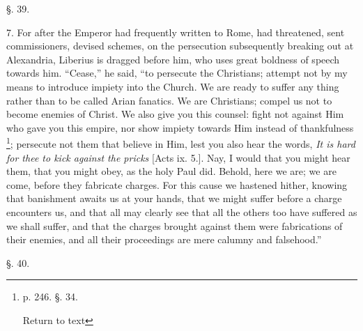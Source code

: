§. 39.

7. For after the Emperor had frequently written
to Rome, had threatened, sent commissioners, devised schemes, on the
persecution subsequently breaking out at Alexandria, Liberius is
dragged before him, who uses great boldness of speech towards him. ``Cease,''
he said, ``to persecute the Christians; attempt not by my means to
introduce impiety into the Church. We are ready to suffer any thing
rather than to be called Arian fanatics. We are Christians; compel us
not to become enemies of Christ. We also give you this counsel: fight
not against Him who gave you this empire, nor show impiety towards Him
instead of thankfulness \footnote{p. 246. §. 34.

Return to text}; persecute
not them that believe in Him, lest you also hear the words, \emph{It is
hard for thee to kick against the pricks} [Acts ix. 5.]. Nay, I
would that you might hear them, that you might obey, as the holy Paul
did. Behold, here we are; we are come, before they fabricate charges.
For this cause we hastened hither, knowing that banishment awaits us
at your hands, that we might suffer before a charge encounters us, and
that all may clearly see that all the others too have suffered as we
shall suffer, and that the charges brought against them were
fabrications of their enemies, and all their proceedings are mere
calumny and falsehood.''

§. 40.

